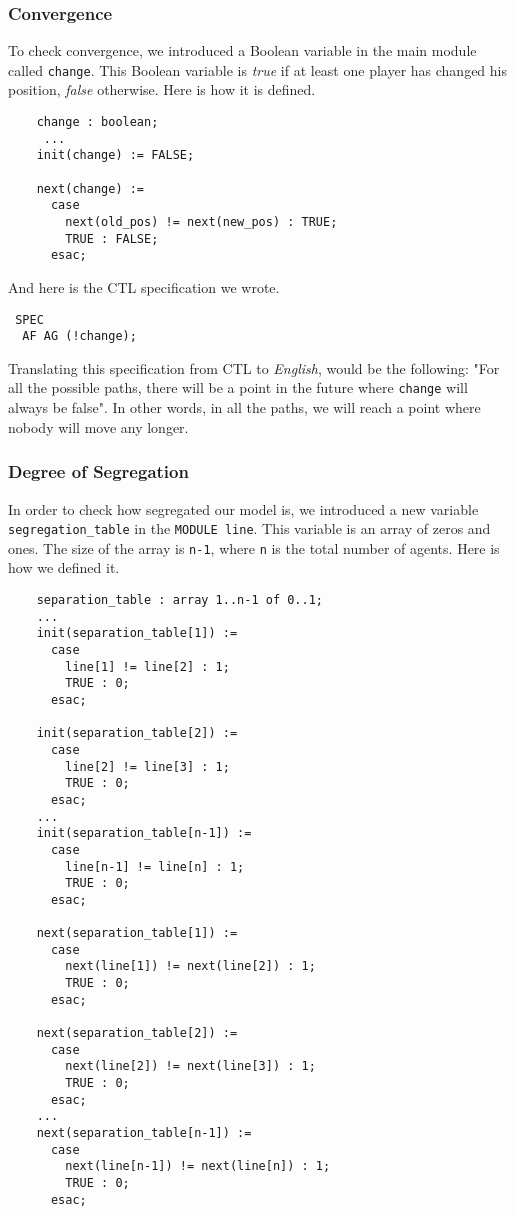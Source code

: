 \documentclass[../main.tex]{subfiles}
\begin{document}
\subsubsection{Convergence}

 To check convergence, we introduced a Boolean variable in the main module called \verb|change|. This Boolean variable is \textit{true} if at least one player has changed his position, \textit{false} otherwise. Here is how it is defined.
 
 \begin{lstlisting}
    change : boolean;
     ...
    init(change) := FALSE;
    
    next(change) := 
      case
        next(old_pos) != next(new_pos) : TRUE;
        TRUE : FALSE;
      esac; 
 \end{lstlisting}
 
 And here is the CTL specification we wrote.
 
 \begin{lstlisting}
 SPEC
  AF AG (!change);
 \end{lstlisting}
 
 Translating this specification from CTL to \textit{English}, would be the following: "For all the possible paths, there will be a point in the future where \verb|change| will always be false". In other words, in all the paths, we will reach a point where nobody will move any longer.\\
 
\subsubsection{Degree of Segregation}
 
 In order to check how segregated our model is, we introduced a new variable  \verb|segregation_table| in the \verb|MODULE line|. This variable is an array of zeros and ones. The size of the array is \verb|n-1|, where \verb|n| is the total number of agents. Here is how we defined it.
 
 \begin{lstlisting}
    separation_table : array 1..n-1 of 0..1;
    ...
    init(separation_table[1]) := 
      case 
        line[1] != line[2] : 1;
        TRUE : 0;
      esac;
    
    init(separation_table[2]) := 
      case 
        line[2] != line[3] : 1;
        TRUE : 0;
      esac;
    ...
    init(separation_table[n-1]) := 
      case 
        line[n-1] != line[n] : 1;
        TRUE : 0;
      esac;
    
    next(separation_table[1]) := 
      case 
        next(line[1]) != next(line[2]) : 1;
        TRUE : 0;
      esac;
    
    next(separation_table[2]) := 
      case 
        next(line[2]) != next(line[3]) : 1;
        TRUE : 0;
      esac;
    ...
    next(separation_table[n-1]) := 
      case 
        next(line[n-1]) != next(line[n]) : 1;
        TRUE : 0;
      esac;

 \end{lstlisting}
 
\end{document}
